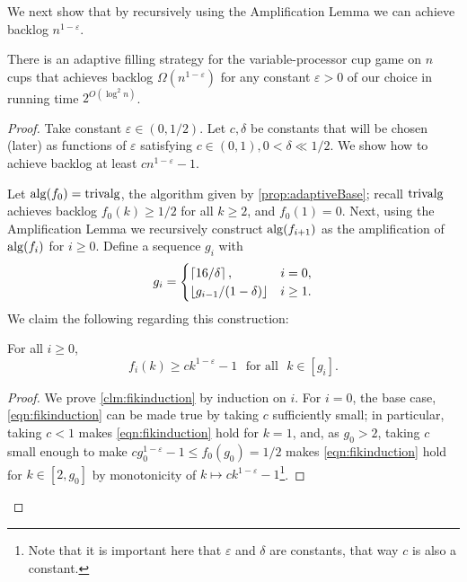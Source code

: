 We next show that by recursively using the Amplification Lemma we
can achieve backlog $n^{1 - \varepsilon}$.
\begin{theorem}
  \label{thm:adaptivePoly}
  There is an adaptive filling strategy for the variable-processor cup game on
  $n$ cups that achieves backlog $\Omega(n^{1-\varepsilon})$ for any constant
  $\varepsilon > 0$ of our choice in running time $2^{O(\log^2 n)}$.
\end{theorem}
\begin{proof}
  Take constant $\varepsilon \in (0,1/2)$. Let $c, \delta$ be
  constants that will be chosen (later) as functions of
  $\varepsilon$ satisfying $c\in (0,1), 0 < \delta \ll 1/2$.
  We show how to achieve backlog at least $cn^{1-\varepsilon}-1$.

 Let $\operatorname{\text{\textup{alg}}}(f_0)=\operatorname{\text{\textup{trivalg}}}$, the algorithm given by
 \cref{prop:adaptiveBase}; recall $\operatorname{\text{\textup{trivalg}}}$ achieves backlog $f_0(k)
 \ge 1/2$ for all $k \ge 2$, and $f_0(1) = 0$. 
  Next, using the Amplification Lemma we recursively construct
  $\operatorname{\text{\textup{alg}}}(f_{i+1})$ as the amplification of $\operatorname{\text{\textup{alg}}}(f_{i})$ for $i\ge 0$. 
  Define a sequence $g_i$ with 
  $$ g_i = \begin{cases}
    \left\lceil 16/\delta \right\rceil,  & i = 0,\\
    \left\lfloor g_{i-1}/(1-\delta) \right\rfloor & i \ge 1.
  \end{cases}$$
  We claim the following regarding this construction:
  \begin{clm}
    \label{clm:fikinduction}
    For all $i\ge0$,
    \begin{equation}
      f_i(k) \ge ck^{1-\varepsilon}-1\,\, \text{ for all }\,\, k\in [g_{i}].
    \label{eqn:fikinduction}
    \end{equation}
  \end{clm}
  \begin{proof}
  We prove \cref{clm:fikinduction} by induction on $i$.
  For $i=0$, the base case, \eqref{eqn:fikinduction} can
  be made true by taking $c$ sufficiently small; in particular,
  taking $c<1$ makes \eqref{eqn:fikinduction} hold for $k = 1$,
  and, as $g_0 > 2$, taking $c$ small enough to make $c
  g_0^{1-\varepsilon} -1 \le f_0(g_0) = 1/2$ makes
  \eqref{eqn:fikinduction} hold for $k\in [2, g_0]$ by
  monotonicity of $k \mapsto ck^{1-\varepsilon}-1$\footnote{Note
  that it is important here that $\varepsilon$ and
  $\delta$ are constants, that way $c$ is also a constant.}.


\end{proof}
\end{proof}
